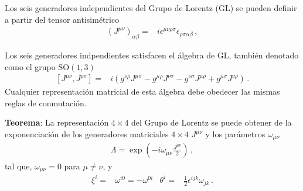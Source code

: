 \begin{frame}
  Los seis generadores independientes del Grupo de Lorentz (GL) se pueden definir a partir del tensor antisimétrico
\begin{align}
   \left(J^{\mu\nu}\right)_{\alpha\beta}=&i\epsilon^{\mu\nu\rho\sigma}\epsilon_{\rho\sigma\alpha\beta}\,,
\end{align}

Los seis generadores indpendientes satisfacen el álgebra de GL, también denotado como el grupo $\operatorname{SO(1,3)}$
\begin{align}
\label{eq:lrtalg}
  \left[{J}^{\mu\nu},{J}^{\rho\sigma}\right]=&
i(g^{\nu\rho}{J}^{\mu\sigma}-g^{\mu\rho}{J}^{\nu\sigma}-g^{\nu\sigma}{J}^{\mu\rho}+g^{\mu\sigma}{J}^{\nu\rho})\,.
\end{align}
Cualquier representación matricial de esta álgebra debe obedecer las mismas reglas de conmutación.


\noindent
\textbf{Teorema}:
  La representación $4\times 4$ del Grupo de Lorentz se puede obtener de la exponenciación de los generadores matriciales $4\times 4$ $J^{\mu\nu}$ y los parámetros $\omega_{\mu\nu}$
\begin{align}
  {\Lambda}=\exp\left(-i\omega_{\mu\nu}\frac{{J}^{\mu\nu}}{2}\right)\,,
\end{align}
tal que,
$\omega_{\mu\nu}=0$ para $\mu\ne\nu$, y
\begin{align}
\xi^i=&\omega^{i0}=-\omega^{0i}&\theta^i=&\frac{1}{2}\epsilon^{ijk}\omega_{jk}\,.  
\end{align}


\end{frame}
